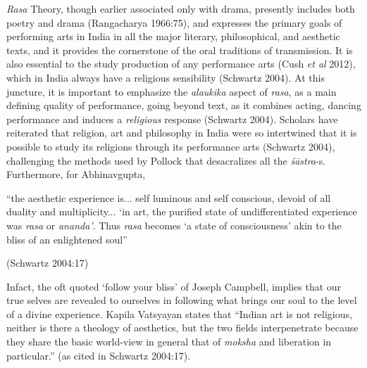 \textsl{Rasa} Theory, though earlier associated only with drama, presently includes both poetry and drama (Rangacharya 1966:75), and expresses the primary goals of performing arts in India in all the major literary, philosophical, and aesthetic texts, and it provides the cornerstone of the oral traditions of transmission. It is also essential to the study production of any performance arts (Cush \textsl{et al} 2012), which in India always have a religious sensibility (Schwartz 2004). At this juncture, it is important to emphasize the \textsl{alaukika} aspect of \textsl{rasa}, as a main defining quality of performance, going beyond text, as it combines acting, dancing performance and induces a \textsl{religious} response (Schwartz 2004). Scholars have reiterated that religion, art and philosophy in India were so intertwined that it is possible to study its religions through its performance arts (Schwartz 2004), challenging the methods used by Pollock that desacralizes all the \textsl{śāstra}-s. Furthermore, for Abhinavgupta, 

\begin{myquote}
“the aesthetic experience is... self luminous and self conscious, devoid of all duality and multiplicity... ‘in art, the purified state of undifferentiated experience was \textsl{rasa} or \textsl{ananda’}. Thus \textsl{rasa} becomes ‘a state of consciousness’ akin to the bliss of an enlightened soul” 

\hfill (Schwartz 2004:17)
\end{myquote}


Infact, the oft quoted ‘follow your bliss’ of Joseph Campbell, implies that our true selves are revealed to ourselves in following what brings our soul to the level of a divine experience. Kapila Vatsyayan states that “Indian art is not religious, neither is there a theology of aesthetics, but the two fields interpenetrate because they share the basic world-view in general that of \textsl{moksha} and liberation in particular.'' (as cited in Schwartz 2004:17). 

